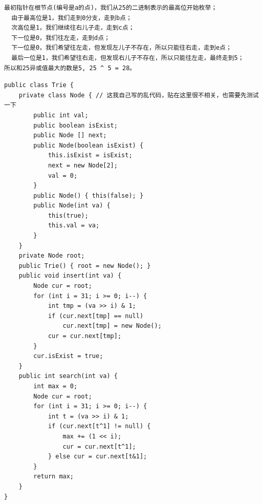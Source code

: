 \documentclass[9pt, b5paaper]{book}
\begin{document}
\begin{verbatim}
最初指针在根节点(编号是a的点)，我们从25的二进制表示的最高位开始枚举；
  由于最高位是1，我们走到0分支，走到b点；
  次高位是1，我们继续往右儿子走，走到c点；
  下一位是0，我们往左走，走到d点；
  下一位是0，我们希望往左走，但发现左儿子不存在，所以只能往右走，走到e点；
  最后一位是1，我们希望往右走，但发现右儿子不存在，所以只能往左走，最终走到5；
所以和25异或值最大的数是5, 25 ^ 5 = 28。
\end{verbatim}
\begin{verbatim}
public class Trie {
    private class Node { // 这我自己写的乱代码，贴在这里很不相关，也需要先测试一下
        public int val;
        public boolean isExist;
        public Node [] next;
        public Node(boolean isExist) {
            this.isExist = isExist;
            next = new Node[2];
            val = 0;
        }
        public Node() { this(false); }
        public Node(int va) {
            this(true);
            this.val = va;
        }
    }
    private Node root;
    public Trie() { root = new Node(); }
    public void insert(int va) {
        Node cur = root;
        for (int i = 31; i >= 0; i--) {
            int tmp = (va >> i) & 1;
            if (cur.next[tmp] == null)
                cur.next[tmp] = new Node();
            cur = cur.next[tmp];
        }
        cur.isExist = true;
    }
    public int search(int va) {
        int max = 0;
        Node cur = root;
        for (int i = 31; i >= 0; i--) {
            int t = (va >> i) & 1;
            if (cur.next[t^1] != null) {
                max += (1 << i);
                cur = cur.next[t^1];
            } else cur = cur.next[t&1];
        }
        return max;
    }
}
\end{verbatim}
\end{document}
